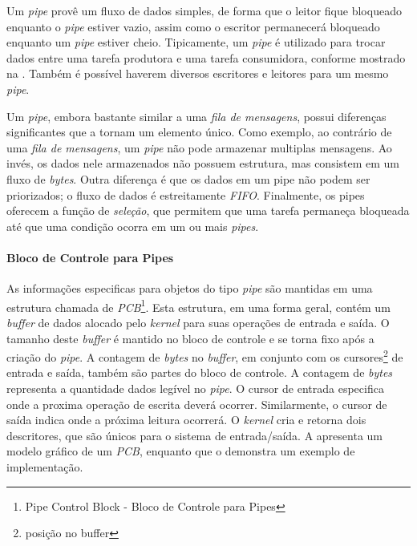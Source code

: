 
Um \emph{pipe} provê um fluxo de dados simples, de forma que o leitor fique bloqueado enquanto o \emph{pipe} estiver vazio, assim como o escritor permanecerá bloqueado enquanto um \emph{pipe} estiver cheio. Tipicamente, um \emph{pipe} é utilizado para trocar dados entre uma tarefa produtora e uma tarefa consumidora, conforme mostrado na . Também é possível haverem diversos escritores e leitores para um mesmo \emph{pipe}.


Um \emph{pipe}, embora bastante similar a uma \emph{fila de mensagens}, possui diferenças significantes que a tornam um elemento único. Como exemplo, ao contrário de uma \emph{fila de mensagens}, um \emph{pipe} não pode armazenar multiplas mensagens. Ao invés, os dados nele armazenados não possuem estrutura, mas consistem em um fluxo de \emph{bytes}. Outra diferença é que os dados em um pipe não podem ser priorizados; o fluxo de dados é estreitamente \emph{FIFO}. Finalmente, os pipes oferecem a função de \emph{seleção}, que permitem que uma tarefa permaneça bloqueada até que uma condição ocorra em um ou mais \emph{pipes}.

\paragraph{Bloco de Controle para Pipes}

As informações especificas para objetos do tipo \emph{pipe} são mantidas em uma estrutura chamada de \emph{PCB}\footnote{Pipe Control Block - Bloco de Controle para Pipes}. Esta estrutura, em uma forma geral, contém um \emph{buffer} de dados alocado pelo \emph{kernel} para suas operações de entrada e saída. O tamanho deste \emph{buffer} é mantido no bloco de controle e se torna fixo após a criação do \emph{pipe}. A contagem de \emph{bytes} no \emph{buffer}, em conjunto com os cursores\footnote{posição no buffer} de entrada e saída, também são partes do bloco de controle. A contagem de \emph{bytes} representa a quantidade dados legível no \emph{pipe}. O cursor de entrada especifica onde a proxima operação de escrita deverá ocorrer. Similarmente, o cursor de saída indica onde a próxima leitura ocorrerá. O \emph{kernel} cria e retorna dois descritores, que são únicos para o sistema de entrada/saída. A  apresenta um modelo gráfico de um \emph{PCB}, enquanto que o  demonstra um exemplo de implementação.


